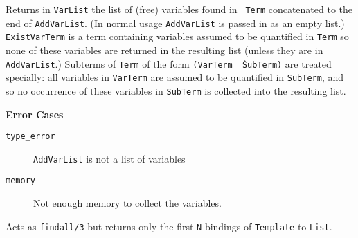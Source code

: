 \begin{description}
Returns in {\tt VarList} the list of (free) variables found in {\tt
Term} concatenated to the end of {\tt AddVarList}.  (In normal usage
{\tt AddVarList} is passed in as an empty list.)  {\tt ExistVarTerm}
is a term containing variables assumed to be quantified in {\tt Term}
so none of these variables are returned in the resulting list (unless
they are in {\tt AddVarList}.)  Subterms of {\tt Term} of the form
{\tt (VarTerm \^\ SubTerm)} are treated specially: all variables in {\tt VarTerm} are
assumed to be quantified in {\tt SubTerm}, and so no occurrence of these
variables in {\tt SubTerm} is collected into the resulting list.

{\bf Error Cases}
    \begin{description}
    \item[{\tt type\_error}]
	{\tt AddVarList} is not a list of variables
     \item[{\tt memory}]
	Not enough memory to collect the variables.
    \end{description}

%
Acts as {\tt findall/3} but returns only the first {\tt N} bindings of
{\tt Template} to {\tt List}.

\end{description}

%


